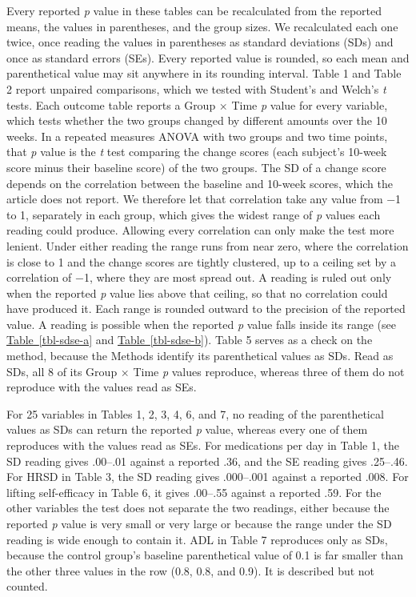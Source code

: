 \documentclass[
  letterpaper,
  DIV=11,
  numbers=noendperiod]{scrartcl}
\begin{document}
Every reported \emph{p} value in these tables can be recalculated from
the reported means, the values in parentheses, and the group sizes. We
recalculated each one twice, once reading the values in parentheses as
standard deviations (SDs) and once as standard errors (SEs). Every
reported value is rounded, so each mean and parenthetical value may sit
anywhere in its rounding interval. Table 1 and Table 2 report unpaired
comparisons, which we tested with Student's and Welch's \emph{t} tests.
Each outcome table reports a Group × Time \emph{p} value for every
variable, which tests whether the two groups changed by different
amounts over the 10 weeks. In a repeated measures ANOVA with two groups
and two time points, that \emph{p} value is the \emph{t} test comparing
the change scores (each subject's 10-week score minus their baseline
score) of the two groups. The SD of a change score depends on the
correlation between the baseline and 10-week scores, which the article
does not report. We therefore let that correlation take any value from
−1 to 1, separately in each group, which gives the widest range of
\emph{p} values each reading could produce. Allowing every correlation
can only make the test more lenient. Under either reading the range runs
from near zero, where the correlation is close to 1 and the change
scores are tightly clustered, up to a ceiling set by a correlation of
−1, where they are most spread out. A reading is ruled out only when the
reported \emph{p} value lies above that ceiling, so that no correlation
could have produced it. Each range is rounded outward to the precision
of the reported value. A reading is possible when the reported \emph{p}
value falls inside its range (see
\hyperref[tbl-sdse-a]{Table~\ref*{tbl-sdse-a}} and
\hyperref[tbl-sdse-b]{Table~\ref*{tbl-sdse-b}}). Table 5 serves as a
check on the method, because the Methods identify its parenthetical
values as SDs. Read as SDs, all 8 of its Group × Time \emph{p} values
reproduce, whereas three of them do not reproduce with the values read
as SEs.

For 25 variables in Tables 1, 2, 3, 4, 6, and 7, no reading of the
parenthetical values as SDs can return the reported \emph{p} value,
whereas every one of them reproduces with the values read as SEs. For
medications per day in Table 1, the SD reading gives .00--.01 against a
reported .36, and the SE reading gives .25--.46. For HRSD in Table 3,
the SD reading gives .000--.001 against a reported .008. For lifting
self-efficacy in Table 6, it gives .00--.55 against a reported .59. For
the other variables the test does not separate the two readings, either
because the reported \emph{p} value is very small or very large or
because the range under the SD reading is wide enough to contain it. ADL
in Table 7 reproduces only as SDs, because the control group's baseline
parenthetical value of 0.1 is far smaller than the other three values in
the row (0.8, 0.8, and 0.9). It is described but not counted.
\end{document}
